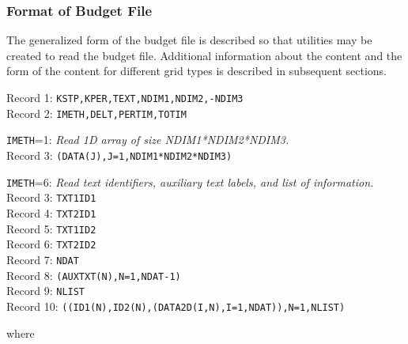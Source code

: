\subsubsection{Format of Budget File}
The generalized form of the budget file is described so that utilities may be created to read the budget file.  Additional information about the content and the form of the content for different grid types is described in subsequent sections.

\vspace{5mm}
\noindent Record 1: \texttt{KSTP,KPER,TEXT,NDIM1,NDIM2,-NDIM3} \\
\noindent Record 2: \texttt{IMETH,DELT,PERTIM,TOTIM} \\

\begin{description}
\item \texttt{IMETH}=1: \textit{Read 1D array of size NDIM1*NDIM2*NDIM3.}\\
Record 3: \texttt{(DATA(J),J=1,NDIM1*NDIM2*NDIM3)}

\item \texttt{IMETH}=6: \textit{Read text identifiers, auxiliary text labels, and list of information.}\\
Record 3: \texttt{TXT1ID1}\\
Record 4: \texttt{TXT2ID1}\\
Record 5: \texttt{TXT1ID2}\\
Record 6: \texttt{TXT2ID2}\\
Record 7: \texttt{NDAT}\\
Record 8: \texttt{(AUXTXT(N),N=1,NDAT-1)}\\
Record 9: \texttt{NLIST}\\
Record 10: \texttt{((ID1(N),ID2(N),(DATA2D(I,N),I=1,NDAT)),N=1,NLIST)}\\
\end{description}

\noindent where

